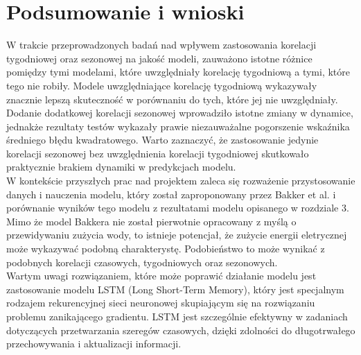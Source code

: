 \documentclass[a4paper,twoside,12pt]{book}
\begin{document}
\chapter{Podsumowanie i wnioski}

W trakcie przeprowadzonych badań nad wpływem zastosowania korelacji tygodniowej oraz sezonowej na jakość modeli, zauważono istotne różnice pomiędzy tymi modelami, które uwzględniały korelację tygodniową a tymi, które tego nie robiły. Modele uwzględniające korelację tygodniową wykazywały znacznie lepszą skuteczność w porównaniu do tych, które jej nie uwzględniały. Dodanie dodatkowej korelacji sezonowej wprowadziło istotne zmiany w dynamice, jednakże rezultaty testów wykazały prawie niezauważalne pogorszenie wskaźnika średniego błędu kwadratowego. Warto zaznaczyć, że zastosowanie jedynie korelacji sezonowej bez uwzględnienia korelacji tygodniowej skutkowało praktycznie brakiem dynamiki w predykcjach modelu.\\
W kontekście przyszłych prac nad projektem zaleca się rozważenie przystosowanie danych i nauczenia modelu, który został zaproponowany przez Bakker et al.\cite{bib:model_przewidywania} i porównanie wyników tego modelu z rezultatami modelu opisanego w rozdziale 3. Mimo że model Bakkera nie został pierwotnie opracowany z myślą o przewidywaniu zużycia wody, to istnieje potencjał, że zużycie energii eletrycznej może wykazywać podobną charakterystę. Podobieństwo to może wynikać z podobnych korelacji czasowych, tygodniowych oraz sezonowych.\\
Wartym uwagi rozwiązaniem, które może poprawić działanie modelu jest zastosowanie modelu LSTM (Long Short-Term Memory), który jest specjalnym rodzajem rekurencyjnej sieci neuronowej skupiającym się na rozwiązaniu problemu zanikającego gradientu. LSTM jest szczególnie efektywny w zadaniach dotyczących przetwarzania szeregów czasowych, dzięki zdolności do długotrwałego przechowywania i aktualizacji informacji.\\
\end{document}

